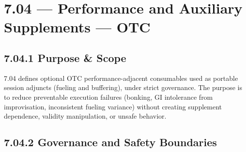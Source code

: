 \documentclass[10pt]{article}
\begin{document}
\section*{7.04 — Performance and Auxiliary Supplements — OTC}
{}

\subsection*{7.04.1 Purpose \& Scope}
{}

7.04 defines optional OTC performance-adjacent consumables used as portable session adjuncts (fueling and buffering), under strict governance. The purpose is to reduce preventable execution failures (bonking, GI intolerance from improvisation, inconsistent fueling variance) without creating supplement dependence, validity manipulation, or unsafe behavior.

\subsection*{7.04.2 Governance and Safety Boundaries}
{}
\end{document}
